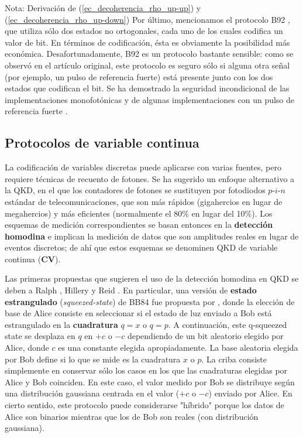 \documentclass[a4paper,11pt]{book} %
\numberwithin{equation}{chapter}
\begin{document}
\begin{mybox_blue}{Nota: Derivación de (\ref{ec_decoherencia_rho_up-up}) y  (\ref{ec_decoherencia_rho_up-down})}
Por último, mencionamos el protocolo B92 \cite{B92}, que utiliza sólo dos estados no ortogonales, cada uno de los cuales codifica un valor de bit. En términos de codificación, ésta es obviamente la posibilidad más económica. Desafortunadamente, B92 es un protocolo bastante sensible: como se observó en el artículo original, este protocolo es seguro sólo si alguna otra señal (por ejemplo, un pulso de referencia fuerte) está presente junto con los dos estados que codifican el bit. Se ha demostrado la seguridad incondicional de las implementaciones monofotónicas \cite{B92_proof_1,B92_proof_2} y de algunas implementaciones con un pulso de referencia fuerte \cite{B92_proof_3,B92_proof_4}. 




		\subsection{Protocolos de variable continua} \label{subsec_QKD_continua}
		
La codificación de variables discretas puede aplicarse con varias fuentes, pero requiere técnicas de recuento de fotones. Se ha sugerido un enfoque alternativo a la QKD, en el que los contadores de fotones se sustituyen por fotodiodos $p$-$i$-$n$ estándar de telecomunicaciones, que son más rápidos (gigahercios en lugar de megahercios) y más eficientes (normalmente el 80\% en lugar del 10\%). Los esquemas de medición correspondientes se basan entonces en la \textbf{detección homodina} e implican la medición de datos que son amplitudes reales en lugar de eventos discretos; de ahí que estos esquemas se denominen QKD de variable continua (\textbf{CV}).

Las primeras propuestas que sugieren el uso de la detección homodina en QKD se deben a Ralph \cite{Continue_var_Ralph_1999}, Hillery \cite{Continue_var_Hillery_2000} y Reid \cite{Continue_var_Reid_2000}. En particular, una versión de \textbf{estado estrangulado} (\textit{squeezed-state}) de BB84 fue propuesta por \cite{Continue_var_Hillery_2000}, donde la elección de base de Alice consiste en seleccionar si el estado de luz enviado a Bob está estrangulado en la \textbf{cuadratura} $q = x$ o $q = p$. A continuación, este q-squeezed state se desplaza en $q$ en $+c$ o $-c$ dependiendo de un bit aleatorio elegido por Alice, donde $c$ es una constante elegida apropiadamente. La base aleatoria elegida por Bob define si lo que se mide es la cuadratura $x$ o $p$. La criba consiste simplemente en conservar sólo los casos en los que las cuadraturas elegidas por Alice y Bob coinciden. En este caso, el valor medido por Bob se distribuye según una distribución gaussiana centrada en el valor ($+c$ o $-c$) enviado por Alice. En cierto sentido, este protocolo puede considerarse "híbrido" porque los datos de Alice son binarios mientras que los de Bob son reales (con distribución gaussiana).


\end{mybox_blue}
\end{document}
